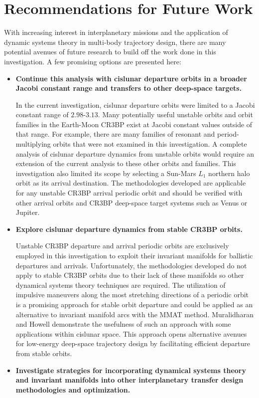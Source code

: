 \section{Recommendations for Future Work}
With increasing interest in interplanetary missions and the application of dynamic systems theory
in multi-body trajectory design, there are many potential avenues of future research to build off
the work done in this investigation. A few promising options are presented here:
\begin{itemize}
    \item   \textbf{Continue this analysis with cislunar departure orbits in a broader Jacobi
            constant range and transfers to other deep-space targets.}

            In the current investigation, cislunar departure orbits were limited to a Jacobi
            constant range of $2.98$-$3.13$. Many potentially useful unstable orbits and orbit
            families in the Earth-Moon CR3BP exist at Jacobi constant values outside of that range.
            For example, there are many families of resonant and period-multiplying orbits that
            were not examined in this investigation. A complete analysis of cislunar departure
            dynamics from unstable orbits would require an extension of the current analysis to
            these other orbits and families. This investigation also limited its scope by selecting
            a Sun-Mars $L_{1}$ northern halo orbit as its arrival destination. The methodologies
            developed are applicable for any unstable CR3BP arrival periodic orbit and should be
            verified with other arrival orbits and CR3BP deep-space target systems such as Venus or
            Jupiter.
    \item   \textbf{Explore cislunar departure dynamics from stable CR3BP orbits.}
    
            Unstable CR3BP departure and arrival periodic orbits are exclusively employed in this
            investigation to exploit their invariant manifolds for ballistic departures and
            arrivals. Unfortunately, the methodologies developed do not apply to stable CR3BP
            orbits due to their lack of these manifolds so other dynamical systems theory
            techniques are required. The utilization of impulsive maneuvers along the most
            stretching directions of a periodic orbit is a promising approach for stable orbit
            departure and could be applied as an alternative to invariant manifold arcs with the
            MMAT method. Muralidharan and Howell demonstrate the usefulness of such an approach
            with some applications within cislunar space\cite{Muralidharan:2022}. This approach
            opens alternative avenues for low-energy deep-space trajectory design by facilitating
            efficient departure from stable orbits.
    \item   \textbf{Investigate strategies for incorporating dynamical systems theory and invariant
            manifolds into other interplanetary transfer design methodologies and optimization.}


\end{itemize}
